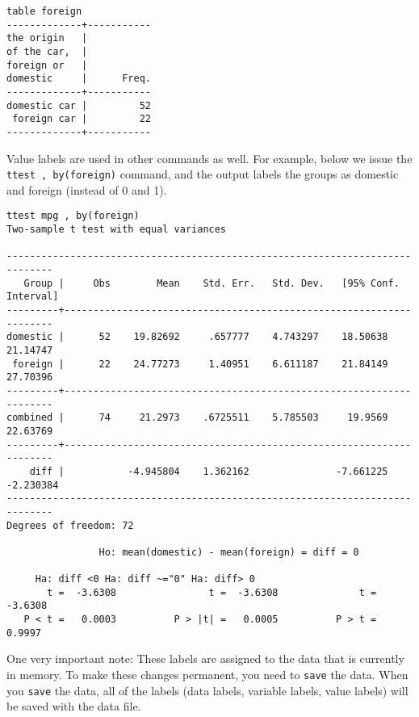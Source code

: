\begin{lstlisting}
table foreign
-------------+-----------
the origin   |
of the car,  |
foreign or   |
domestic     |      Freq.
-------------+-----------
domestic car |         52
 foreign car |         22
-------------+-----------
\end{lstlisting}

Value labels are used in other commands as well. For example, below we issue the \lstinline{ttest , by(foreign)} command, and the output labels the groups as domestic and foreign (instead of 0 and 1).

\begin{lstlisting}
ttest mpg , by(foreign)
Two-sample t test with equal variances

------------------------------------------------------------------------------
   Group |     Obs        Mean    Std. Err.   Std. Dev.   [95% Conf. Interval]
---------+--------------------------------------------------------------------
domestic |      52    19.82692     .657777    4.743297    18.50638    21.14747
 foreign |      22    24.77273     1.40951    6.611187    21.84149    27.70396
---------+--------------------------------------------------------------------
combined |      74     21.2973    .6725511    5.785503     19.9569    22.63769
---------+--------------------------------------------------------------------
    diff |           -4.945804    1.362162               -7.661225   -2.230384
------------------------------------------------------------------------------
Degrees of freedom: 72

                Ho: mean(domestic) - mean(foreign) = diff = 0

     Ha: diff <0 Ha: diff ~="0" Ha: diff> 0
       t =  -3.6308                t =  -3.6308              t =  -3.6308
   P < t =   0.0003          P > |t| =   0.0005          P > t =   0.9997
\end{lstlisting}

One very important note:  These labels are assigned to the data that is currently in memory.  To make these changes permanent, you need to \lstinline{save} the data.  When you \lstinline{save} the data, all of the labels (data labels, variable labels, value labels) will be saved with the data file.

